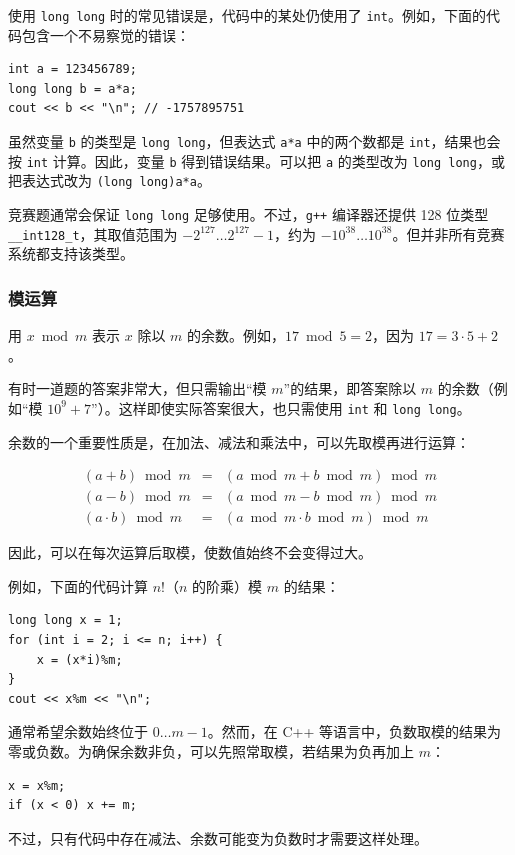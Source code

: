 使用 \texttt{long long} 时的常见错误是，代码中的某处仍使用了 \texttt{int}。例如，下面的代码包含一个不易察觉的错误：

\begin{lstlisting}
int a = 123456789;
long long b = a*a;
cout << b << "\n"; // -1757895751
\end{lstlisting}

虽然变量 \texttt{b} 的类型是 \texttt{long long}，但表达式 \texttt{a*a} 中的两个数都是 \texttt{int}，结果也会按 \texttt{int} 计算。因此，变量 \texttt{b} 得到错误结果。可以把 \texttt{a} 的类型改为 \texttt{long long}，或把表达式改为 \texttt{(long long)a*a}。

竞赛题通常会保证 \texttt{long long} 足够使用。不过，\texttt{g++} 编译器还提供 128 位类型 \texttt{\_\_int128\_t}，其取值范围为 $-2^{127} \ldots 2^{127}-1$，约为 $-10^{38} \ldots 10^{38}$。但并非所有竞赛系统都支持该类型。

\subsubsection{模运算}


用 $x \bmod m$ 表示 $x$ 除以 $m$ 的余数。例如，$17 \bmod 5 = 2$，因为 $17 = 3 \cdot 5 + 2$。

有时一道题的答案非常大，但只需输出“模 $m$”的结果，即答案除以 $m$ 的余数（例如“模 $10^9+7$”）。这样即使实际答案很大，也只需使用 \texttt{int} 和 \texttt{long long}。

余数的一个重要性质是，在加法、减法和乘法中，可以先取模再进行运算：

\[
\begin{array}{rcr}
(a+b) \bmod m & = & (a \bmod m + b \bmod m) \bmod m \\
(a-b) \bmod m & = & (a \bmod m - b \bmod m) \bmod m \\
(a \cdot b) \bmod m & = & (a \bmod m \cdot b \bmod m) \bmod m
\end{array}
\]

因此，可以在每次运算后取模，使数值始终不会变得过大。

例如，下面的代码计算 $n!$（$n$ 的阶乘）模 $m$ 的结果：
\begin{lstlisting}
long long x = 1;
for (int i = 2; i <= n; i++) {
    x = (x*i)%m;
}
cout << x%m << "\n";
\end{lstlisting}

通常希望余数始终位于 $0\ldots m-1$。然而，在 C++ 等语言中，负数取模的结果为零或负数。为确保余数非负，可以先照常取模，若结果为负再加上 $m$：
\begin{lstlisting}
x = x%m;
if (x < 0) x += m;
\end{lstlisting}
不过，只有代码中存在减法、余数可能变为负数时才需要这样处理。

